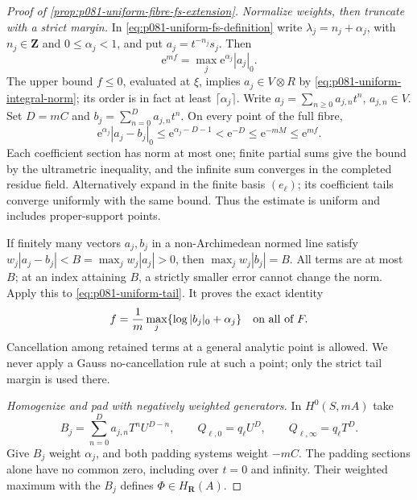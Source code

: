 \begin{proof}[Proof of \cref{prop:p081-uniform-fibre-fs-extension}]
\emph{Normalize weights, then truncate with a strict margin.}
In \eqref{eq:p081-uniform-fs-definition} write
\(\lambda_j=n_j+\alpha_j\), with \(n_j\in\mathbf Z\) and
\(0\leq\alpha_j<1\), and put \(a_j=t^{-n_j}s_j\). Then
\[
                  \mathrm e^{mf}=\max_j
                       \mathrm e^{\alpha_j}|a_j|_0.
\]
The upper bound \(f\leq0\), evaluated at \(\xi\), implies
\(a_j\in V\otimes R\) by \eqref{eq:p081-uniform-integral-norm}; its
order is in fact at least \(\lceil\alpha_j\rceil\). Write
\(a_j=\sum_{n\geq0}a_{j,n}t^n\), \(a_{j,n}\in V\). Set
\(D=mC\) and \(b_j=\sum_{n=0}^{D}a_{j,n}t^n\). On every point of
the full fibre,
\begin{equation}\label{eq:p081-uniform-tail}
 \mathrm e^{\alpha_j}|a_j-b_j|_0
 \leq\mathrm e^{\alpha_j-D-1}<\mathrm e^{-D}
 \leq\mathrm e^{-mM}\leq\mathrm e^{mf}.
\end{equation}
Each coefficient section has norm at most one; finite partial sums give
the bound by the ultrametric inequality, and the infinite sum converges
in the completed residue field. Alternatively expand in the finite basis
\((e_\ell)\); its coefficient tails converge uniformly with the same
bound. Thus the estimate is uniform and includes proper-support points.

If finitely many vectors \(a_j,b_j\) in a non-Archimedean normed line
satisfy \(w_j|a_j-b_j|<B=\max_j w_j|a_j|>0\), then
\(\max_j w_j|b_j|=B\). All terms are at most \(B\); at an index
attaining \(B\), a strictly smaller error cannot change the norm.
Apply this to \eqref{eq:p081-uniform-tail}. It proves the exact identity
\begin{equation}\label{eq:p081-uniform-truncation}
                f=\frac1m\max_j\{\log|b_j|_0+\alpha_j\}
                      \quad\hbox{on all of }F.
\end{equation}
Cancellation among retained terms at a general analytic point is allowed.
We never apply a Gauss no-cancellation rule at such a point; only the
strict tail margin is used there.

\emph{Homogenize and pad with negatively weighted generators.}
In \(H^0(S,mA)\) take
\[
 B_j=\sum_{n=0}^{D}a_{j,n}T^nU^{D-n},\qquad
 Q_{\ell,0}=q_\ell U^D,\qquad Q_{\ell,\infty}=q_\ell T^D.
\]
Give \(B_j\) weight \(\alpha_j\), and both padding systems weight
\(-mC\). The padding sections alone have no common zero, including
over \(t=0\) and infinity. Their weighted maximum with the \(B_j\)
defines \(\Phi\in H_{\mathbf R}(A)\).


\end{proof}
